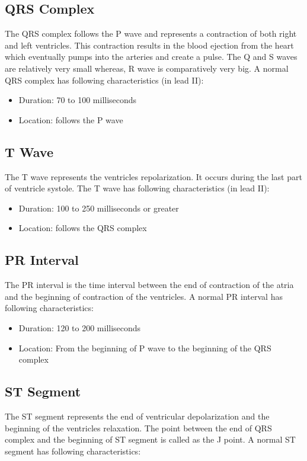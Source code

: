 \subsection{QRS Complex}
The QRS complex follows the P wave and represents a contraction of both right and left ventricles. This contraction results in the blood ejection from the heart which eventually pumps into the arteries and create a pulse. The Q and S waves are relatively very small whereas, R wave is comparatively very big. A normal QRS complex has following characteristics (in lead II):

\begin{itemize}
	\item Duration: 70 to 100 milliseconds
	\item Location: follows the P wave
\end{itemize}

\subsection{T Wave}
The T wave represents the ventricles repolarization. It occurs during the last part of ventricle systole. The T wave has following characteristics (in lead II):

\begin{itemize}
	\item Duration: 100 to 250 milliseconds or greater
	\item Location: follows the QRS complex
\end{itemize}

\subsection{PR Interval}
The PR interval is the time interval between the end of contraction of the atria and the beginning of contraction of the ventricles. A normal PR interval has following characteristics:

\begin{itemize}
	\item Duration: 120 to 200 milliseconds
	\item Location: From the beginning of P wave to the beginning of the QRS complex
\end{itemize}

\subsection{ST Segment}
The ST segment represents the end of ventricular depolarization and the beginning of the ventricles relaxation. The point between the end of QRS complex and the beginning of ST segment is called as the J point. A normal ST segment has following characteristics:

